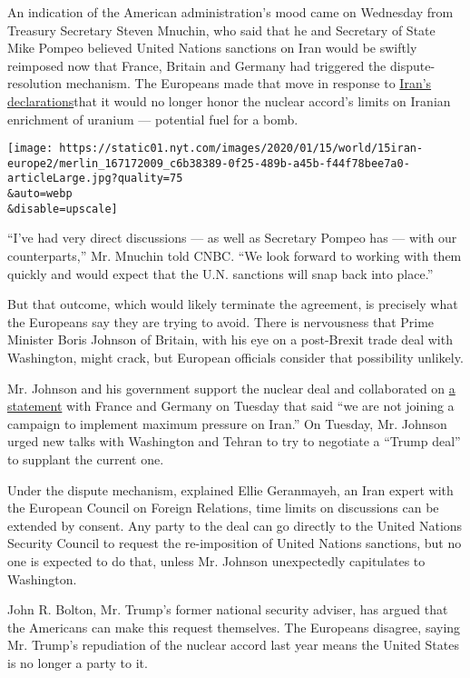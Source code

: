 An indication of the American administration's mood came on Wednesday
from Treasury Secretary Steven Mnuchin, who said that he and Secretary
of State Mike Pompeo believed United Nations sanctions on Iran would be
swiftly reimposed now that France, Britain and Germany had triggered the
dispute-resolution mechanism. The Europeans made that move in response
to
\href{https://www.nytimes.com/2020/01/05/world/middleeast/trump-iran-nuclear-agreement.html?searchResultPosition=2}{Iran's
declarations}that it would no longer honor the nuclear accord's limits
on Iranian enrichment of uranium --- potential fuel for a bomb.

\texttt{[image: https://static01.nyt.com/images/2020/01/15/world/15iran-europe2/merlin\_167172009\_c6b38389-0f25-489b-a45b-f44f78bee7a0-articleLarge.jpg?quality=75\\\&auto=webp\\\&disable=upscale]}

``I've had very direct discussions --- as well as Secretary Pompeo has
--- with our counterparts,'' Mr. Mnuchin told CNBC. ``We look forward to
working with them quickly and would expect that the U.N. sanctions will
snap back into place.''

But that outcome, which would likely terminate the agreement, is
precisely what the Europeans say they are trying to avoid. There is
nervousness that Prime Minister Boris Johnson of Britain, with his eye
on a post-Brexit trade deal with Washington, might crack, but European
officials consider that possibility unlikely.

Mr. Johnson and his government support the nuclear deal and collaborated
on
\href{https://www.diplomatie.gouv.fr/en/country-files/iran/news/article/joint-statement-by-the-foreign-ministers-of-france-germany-and-the-united}{a
statement} with France and Germany on Tuesday that said ``we are not
joining a campaign to implement maximum pressure on Iran.'' On Tuesday,
Mr. Johnson urged new talks with Washington and Tehran to try to
negotiate a ``Trump deal'' to supplant the current one.

Under the dispute mechanism, explained Ellie Geranmayeh, an Iran expert
with the European Council on Foreign Relations, time limits on
discussions can be extended by consent. Any party to the deal can go
directly to the United Nations Security Council to request the
re-imposition of United Nations sanctions, but no one is expected to do
that, unless Mr. Johnson unexpectedly capitulates to Washington.

John R. Bolton, Mr. Trump's former national security adviser, has argued
that the Americans can make this request themselves. The Europeans
disagree, saying Mr. Trump's repudiation of the nuclear accord last year
means the United States is no longer a party to it.

